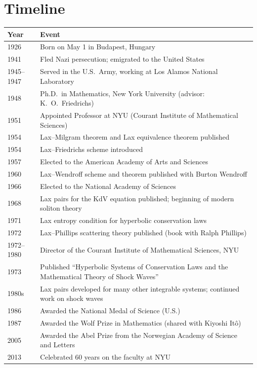 \section*{Timeline}
\begin{tabularx}{\linewidth}{|p{1.5cm}|>{\raggedright\arraybackslash}X|}
\hline
\textbf{Year} & \textbf{Event} \\ \hline
1926 & Born on May 1 in Budapest, Hungary \\ \hline
1941 & Fled Nazi persecution; emigrated to the United States \\ \hline
1945--1947 & Served in the U.S.\ Army, working at Los Alamos National Laboratory \\ \hline
1948 & Ph.D.\ in Mathematics, New York University (advisor: K.\ O.\ Friedrichs) \\ \hline
1951 & Appointed Professor at NYU (Courant Institute of Mathematical Sciences) \\ \hline
1954 & Lax--Milgram theorem and Lax equivalence theorem published \\ \hline
1954 & Lax--Friedrichs scheme introduced \\ \hline
1957 & Elected to the American Academy of Arts and Sciences \\ \hline
1960 & Lax--Wendroff scheme and theorem published with Burton Wendroff \\ \hline
1966 & Elected to the National Academy of Sciences \\ \hline
1968 & Lax pairs for the KdV equation published; beginning of modern soliton theory \\ \hline
1971 & Lax entropy condition for hyperbolic conservation laws \\ \hline
1972 & Lax--Phillips scattering theory published (book with Ralph Phillips) \\ \hline
1972--1980 & Director of the Courant Institute of Mathematical Sciences, NYU \\ \hline
1973 & Published ``Hyperbolic Systems of Conservation Laws and the Mathematical Theory of Shock Waves'' \\ \hline
1980s & Lax pairs developed for many other integrable systems; continued work on shock waves \\ \hline
1986 & Awarded the National Medal of Science (U.S.) \\ \hline
1987 & Awarded the Wolf Prize in Mathematics (shared with Kiyoshi It\^{o}) \\ \hline
2005 & Awarded the Abel Prize from the Norwegian Academy of Science and Letters \\ \hline
2013 & Celebrated 60 years on the faculty at NYU \\ \hline
\end{tabularx}

